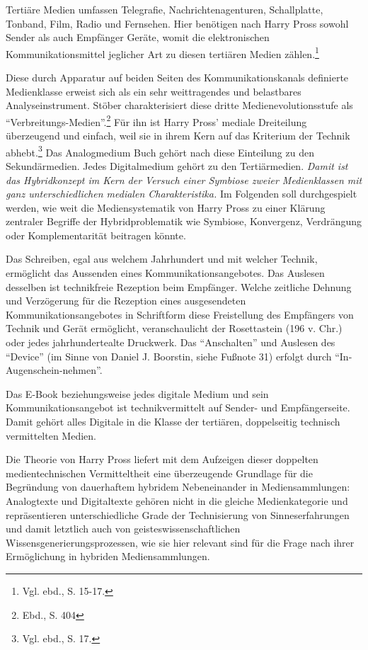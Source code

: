 \documentclass[a4paper,
fontsize=11pt,
oneside,
numbers=noperiodatend,
parskip=half-,
bibliography=totoc,
final
]{scrartcl}
\begin{document}
Tertiäre Medien umfassen Telegrafie, Nachrichtenagenturen, Schallplatte,
Tonband, Film, Radio und Fernsehen. Hier benötigen nach Harry Pross
sowohl Sender als auch Empfänger Geräte, womit die elektronischen
Kommunikationsmittel jeglicher Art zu diesen tertiären Medien
zählen.\footnote{Vgl. ebd., S. 15-17.}

Diese durch Apparatur auf beiden Seiten des Kommunikationskanals
definierte Medienklasse erweist sich als ein sehr weittragendes und
belastbares Analyseinstrument. Stöber charakterisiert diese dritte
Medienevolutionsstufe als \enquote{Verbreitungs-Medien}.\footnote{Ebd.,
  S. 404} Für ihn ist Harry Pross' mediale Dreiteilung überzeugend und
einfach, weil sie in ihrem Kern auf das Kriterium der Technik
abhebt.\footnote{Vgl. ebd., S. 17.} Das Analogmedium Buch gehört nach
diese Einteilung zu den Sekundärmedien. Jedes Digitalmedium gehört zu
den Tertiärmedien. \emph{Damit ist das Hybridkonzept im Kern der Versuch
einer Symbiose zweier Medienklassen mit ganz unterschiedlichen medialen
Charakteristika.} Im Folgenden soll durchgespielt werden, wie weit die
Mediensystematik von Harry Pross zu einer Klärung zentraler Begriffe der
Hybridproblematik wie Symbiose, Konvergenz, Verdrängung oder
Komplementarität beitragen könnte.

Das Schreiben, egal aus welchem Jahrhundert und mit welcher Technik,
ermöglicht das Aussenden eines Kommunikationsangebotes. Das Auslesen
desselben ist technikfreie Rezeption beim Empfänger. Welche zeitliche
Dehnung und Verzögerung für die Rezeption eines ausgesendeten
Kommunikationsangebotes in Schriftform diese Freistellung des Empfängers
von Technik und Gerät ermöglicht, veranschaulicht der Rosettastein (196
v. Chr.) oder jedes jahrhundertealte Druckwerk. Das \enquote{Anschalten}
und Auslesen des \enquote{Device} (im Sinne von Daniel J. Boorstin,
siehe Fußnote 31) erfolgt durch \enquote{In-Augenschein-nehmen}.

Das E-Book beziehungsweise jedes digitale Medium und sein
Kommunikationsangebot ist technikvermittelt auf Sender- und
Empfängerseite. Damit gehört alles Digitale in die Klasse der tertiären,
doppelseitig technisch vermittelten Medien.

Die Theorie von Harry Pross liefert mit dem Aufzeigen dieser doppelten
medientechnischen Vermitteltheit eine überzeugende Grundlage für die
Begründung von dauerhaftem hybridem Nebeneinander in Mediensammlungen:
Analogtexte und Digitaltexte gehören nicht in die gleiche
Medienkategorie und repräsentieren unterschiedliche Grade der
Technisierung von Sinneserfahrungen und damit letztlich auch von
geisteswissenschaftlichen Wissensgenerierungsprozessen, wie sie hier
relevant sind für die Frage nach ihrer Ermöglichung in hybriden
Mediensammlungen.
\end{document}
